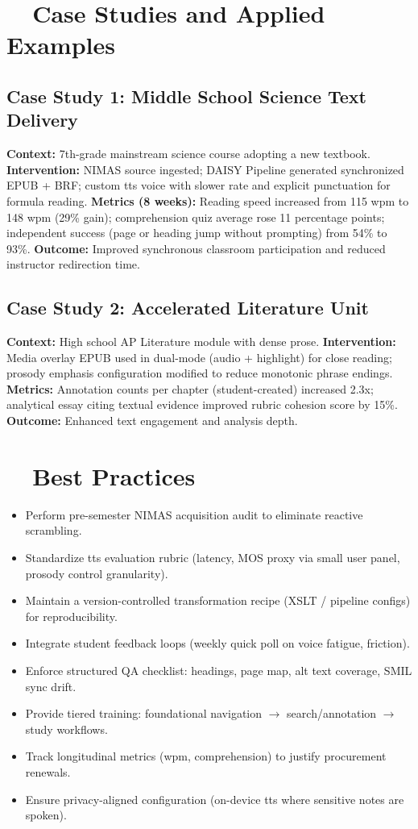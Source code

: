 \section{~~Case Studies and Applied Examples}\label{ch07:sec:case-studies}
\subsection{Case Study 1: Middle School Science Text Delivery}
\textbf{Context:} 7th-grade mainstream science course adopting a new textbook.
\textbf{Intervention:} NIMAS source ingested; DAISY Pipeline generated synchronized EPUB + BRF; custom \gls{tts} voice with slower rate and
explicit punctuation for formula reading.
\textbf{Metrics (8 weeks):} Reading speed increased from 115 wpm to 148 wpm (29\% gain); comprehension quiz average rose 11 percentage points;
independent  success (page or heading jump without prompting) from 54\% to 93\%.
\textbf{Outcome:} Improved synchronous classroom participation and reduced instructor redirection time.

\subsection{Case Study 2: Accelerated Literature Unit}
\textbf{Context:} High school AP Literature module with dense prose.
\textbf{Intervention:} Media overlay EPUB used in dual-mode (audio + highlight) for close reading; prosody emphasis configuration
modified to reduce monotonic phrase endings.
\textbf{Metrics:} Annotation counts per chapter (student-created) increased 2.3x; analytical essay citing textual evidence improved rubric
cohesion score by 15\%.
\textbf{Outcome:} Enhanced text engagement and analysis depth.

\section{~~Best Practices}\label{ch07:sec:best-practices}
\begin{itemize}
	\item Perform pre-semester NIMAS acquisition audit to eliminate reactive scrambling.
	\item Standardize \gls{tts} evaluation rubric (latency, MOS proxy via small user panel, prosody control granularity).
	\item Maintain a version-controlled transformation recipe (XSLT / pipeline configs) for reproducibility.
	\item Integrate student feedback loops (weekly quick poll on voice fatigue,  friction).
	\item Enforce structured QA checklist: headings, page map, alt text coverage, SMIL sync drift.
	\item Provide tiered training: foundational navigation $\rightarrow$ search/annotation $\rightarrow$ study workflows.
	\item Track longitudinal metrics (wpm, comprehension) to justify procurement renewals.
	\item Ensure privacy-aligned configuration (on-device \gls{tts} where sensitive notes are spoken).
\end{itemize}

